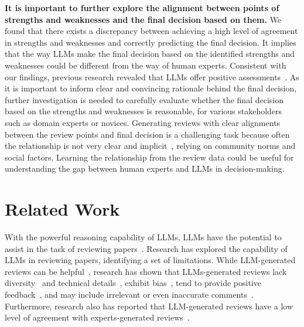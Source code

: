  
\textbf{It is important to further explore the alignment between points of strengths and weaknesses and the final decision based on them.} We found that there exists a discrepancy between achieving a high level of agreement in strengths and weaknesses and correctly predicting the final decision. It implies that the way LLMs make the final decision based on the identified strengths and weaknesses could be different from the way of human experts. Consistent with our findings, previous research revealed that LLMs offer positive assessments~\cite{latona2024aireview}. As it is important to inform clear and convincing rationale behind the final decision, further investigation is needed to carefully evaluate whether the final decision based on the strengths and weaknesses is reasonable, for various stakeholders such as domain experts or novices. Generating reviews with clear alignments between the review points and final decision is a challenging task because often the relationship is not very clear and implicit~\cite{zhou2024llm}, relying on community norms and social factors. Learning the relationship from the review data could be useful for understanding the gap between human experts and LLMs in decision-making.


\section{Related Work}

With the powerful reasoning capability of LLMs, LLMs have the potential to assist in the task of reviewing papers~\citep{latona2024ai, d2024marg}. Research has explored the capability of LLMs in reviewing papers, identifying a set of limitations. While LLM-generated reviews can be helpful~\citep{liang2024can, tyser2024ai, Lu2024TheAS}, research has shown that LLMs-generated reviews lack diversity~\citep{du2024llms, liang2024can} and technical details~\citep{zhou2024llm}, exhibit bias~\citep{Ye2024AreWT}, tend to provide positive feedback~\citep{zhou2024llm, du2024llms}, and may include irrelevant or even inaccurate comments~\citep{mostafapour2024evaluating}. Furthermore, research also has reported that LLM-generated reviews have a low level of agreement with experts-generated reviews~\citep{saad2024exploring}. 

